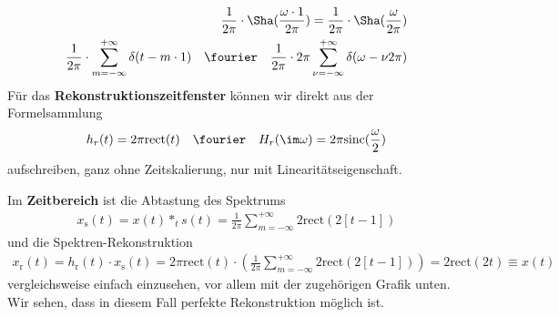 \begin{ExCalc}
\begin{align}
\frac{1}{2\pi}\cdot{\Sha}(\frac{\omega \cdot 1}{2 \pi}) =
\frac{1}{2\pi}\cdot\Sha(\frac{\omega}{2\pi})\\
\frac{1}{2\pi}\cdot\sum_{m=-\infty}^{+\infty} \delta(t-m \cdot 1) \quad\fourier\quad
\frac{1}{2\pi}\cdot 2\pi \sum_{\nu=-\infty}^{+\infty} \delta(\omega-\nu 2\pi)
\end{align}
%
Für das \textbf{Rekonstruktionszeitfenster} können wir direkt aus der Formelsammlung
\begin{align}
h_r(t) = 2\pi\mathrm{rect}(t)
\quad\fourier\quad
H_r(\im\omega) = 2\pi\mathrm{sinc}(\frac{\omega}{2})
\end{align}
aufschreiben, ganz ohne Zeitskalierung, nur mit Linearitätseigenschaft.
%
\end{ExCalc}
\begin{Loesung}
%
Im \textbf{Zeitbereich} ist die Abtastung des Spektrums
\begin{align}
x_\mathrm{s}(t) = x(t) \ast_t s(t) = \frac{1}{2\pi} \sum_{m=-\infty}^{+\infty} 2\mathrm{rect}(2[t-1])
\end{align}
und die Spektren-Rekonstruktion
\begin{align}
x_\mathrm{r}(t) = h_\mathrm{r}(t) \cdot x_\mathrm{s}(t) =
2\pi \mathrm{rect}(t) \cdot \left(
\frac{1}{2\pi} \sum_{m=-\infty}^{+\infty} 2\mathrm{rect}(2[t-1])
\right) = 2\mathrm{rect}(2t) \equiv x(t)
\end{align}
vergleichsweise einfach einzusehen, vor allem mit der zugehörigen Grafik unten.
Wir sehen, dass in diesem Fall perfekte Rekonstruktion möglich ist.
%
\begin{center}
\end{center}
\end{Loesung}
